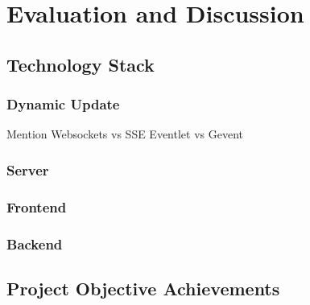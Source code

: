 \chapter{Evaluation and Discussion}

\section{Technology Stack}
\label{sec:eval-tech}

\subsection{Dynamic Update}
Mention Websockets vs SSE
Eventlet vs Gevent

\subsection{Server}

\subsection{Frontend}

\subsection{Backend}

\section{Project Objective Achievements}
